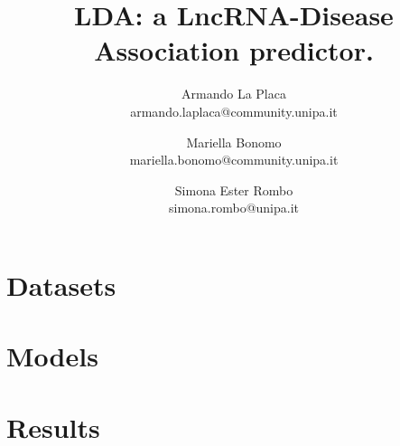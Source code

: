 \documentclass{article}
\title{LDA: a LncRNA-Disease Association predictor.}
\author{Armando La Placa\\ armando.laplaca@community.unipa.it \and Mariella Bonomo\\ mariella.bonomo@community.unipa.it \and  Simona Ester Rombo\\ simona.rombo@unipa.it}
\date{}
\begin{document}
	\maketitle
	\section{Datasets}
	\blindtext
	\section{Models}
	\blindtext
	\section{Results}	
	\blindtext
\end{document}
